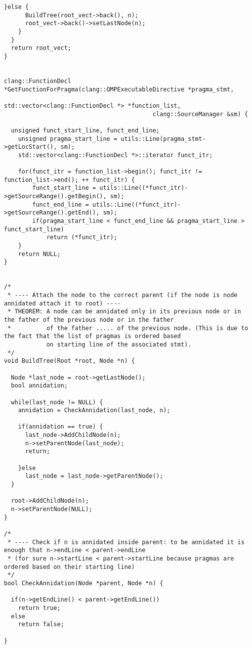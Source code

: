 \documentclass[a4paper,11pt,twoside]{book}
\begin{document}
\begin{lstlisting}[language=CCC, caption=pragma\_handler/create\_tree.cpp]
    }else {
      BuildTree(root_vect->back(), n);
      root_vect->back()->setLastNode(n);
    }
  }
  return root_vect;
}


clang::FunctionDecl *GetFunctionForPragma(clang::OMPExecutableDirective *pragma_stmt, 
										  std::vector<clang::FunctionDecl *> *function_list, 
										  clang::SourceManager &sm) {

  unsigned funct_start_line, funct_end_line;
	unsigned pragma_start_line = utils::Line(pragma_stmt->getLocStart(), sm);
	std::vector<clang::FunctionDecl *>::iterator funct_itr;

	for(funct_itr = function_list->begin(); funct_itr != function_list->end(); ++ funct_itr) {
		funct_start_line = utils::Line((*funct_itr)->getSourceRange().getBegin(), sm);
		funct_end_line = utils::Line((*funct_itr)->getSourceRange().getEnd(), sm);
		if(pragma_start_line < funct_end_line && pragma_start_line > funct_start_line)
			return (*funct_itr);
	}
	return NULL;
}


/*
 * ---- Attach the node to the correct parent (if the node is node annidated attach it to root) ----
 * THEOREM: A node can be annidated only in its previous node or in the father of the previous node or in the father 
 *          of the father ..... of the previous node. (This is due to the fact that the list of pragmas is ordered based
            on starting line of the associated stmt).
 */ 
void BuildTree(Root *root, Node *n) {

  Node *last_node = root->getLastNode();
  bool annidation;

  while(last_node != NULL) {
    annidation = CheckAnnidation(last_node, n);

    if(annidation == true) {
      last_node->AddChildNode(n);
      n->setParentNode(last_node);
      return;

    }else 
      last_node = last_node->getParentNode();
  }

  root->AddChildNode(n);
  n->setParentNode(NULL);
}

/*
 * ---- Check if n is annidated inside parent: to be annidated it is enough that n->endLine < parent->endLine 
 * (for sure n->startLine < parent->startLine because pragmas are ordered based on their starting line)
 */ 
bool CheckAnnidation(Node *parent, Node *n) {

  if(n->getEndLine() < parent->getEndLine())  
    return true;
  else
    return false;
  
}
\end{lstlisting}
\end{document}
